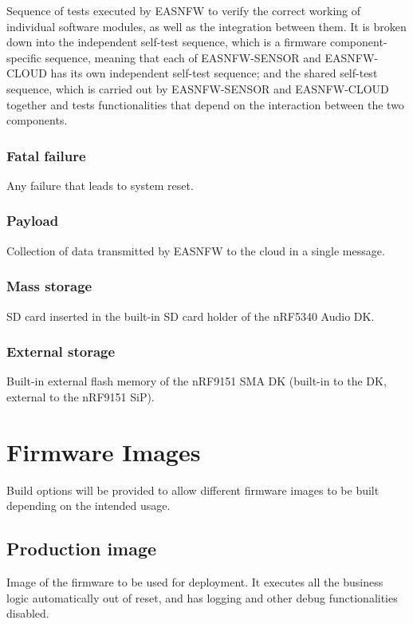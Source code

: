 \documentclass[11pt,a4paper]{article}
\begin{document}
Sequence of tests executed by EASNFW to verify the correct working of individual
software modules, as well as the integration between them. It is broken down
into the independent self-test sequence, which is a firmware component-specific
sequence, meaning that each of EASNFW-SENSOR and EASNFW-CLOUD has its own
independent self-test sequence; and the shared self-test sequence, which is
carried out by EASNFW-SENSOR and EASNFW-CLOUD together and tests functionalities
that depend on the interaction between the two components.

\subsubsection{Fatal failure}

Any failure that leads to system reset.

\subsubsection{Payload}

Collection of data transmitted by EASNFW to the cloud in a single message.

\subsubsection{Mass storage}

SD card inserted in the built-in SD card holder of the nRF5340 Audio DK.

\subsubsection{External storage}

Built-in external flash memory of the nRF9151 SMA DK (built-in to the DK,
external to the nRF9151 SiP).

\section{Firmware Images}\label{sec:firmware-images}

Build options will be provided to allow different firmware images to be built
depending on the intended usage.

\subsection{Production image}

Image of the firmware to be used for deployment. It executes all the business
logic automatically out of reset, and has logging and other debug
functionalities disabled.
\end{document}
